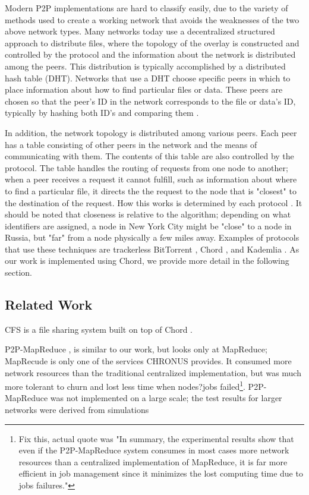 \documentclass[conference, compsocconf, letterpaper]{IEEEtran}
\begin{document}
Modern P2P implementations are hard to classify easily, due to the variety of methods used to create a working network that avoids the weaknesses of the two above network types.  Many networks today use a decentralized structured approach to distribute files, where the topology of the overlay is constructed and controlled by the protocol and the information about the network is distributed among the peers.  This distribution is typically accomplished by a distributed hash table (DHT).  Networks that use a DHT choose specific peers in which to place information about how to find particular files or data.  These peers are chosen so that the peer's ID in the network corresponds to the file or data's ID, typically by hashing both ID's and comparing them  \cite{SurveyCompare}. 

In addition, the network topology is distributed among various peers.  Each peer has a table consisting of other peers in the network and the means of communicating with them.  The contents of this table are also controlled by the protocol.  The table handles the routing of requests from one node to another; when a peer receives a request it cannot fulfill, such as information about where to find a particular file, it directs the the request to the node that is "closest" to the destination of the request. How this works is determined by each protocol \cite{Chord}.  It should be noted that closeness is relative to the algorithm; depending on what identifiers are assigned, a node in New York City might be "close" to a node in Russia, but "far" from a node physically a few miles away.  Examples of protocols that use these techniques are trackerless BitTorrent \cite{BitTorrent}, Chord \cite{Chord}, and Kademlia \cite{Kademlia}. As our work is implemented using Chord, we provide more detail in the following section. 


\subsection{Related Work}

CFS is a file sharing system built on top of Chord \cite{CFS}.

P2P-MapReduce \cite{marozzo2012p2p}, is similar to our work, but looks only at MapReduce; MapRecude is only one of the services CHRONUS provides.  It consumed more network resources than the traditional centralized implementation, but was much more tolerant to churn and lost less time when nodes?jobs failed\footnote{Fix this, actual quote was "In summary, the experimental results show that even if the P2P-MapReduce system consumes in most cases more network resources than a centralized implementation of MapReduce, it is far more efficient in job management since it minimizes the lost computing time due to jobs failures."}.  P2P-MapReduce was not implemented on a large scale; the test results for larger networks were derived from simulations
\end{document}
